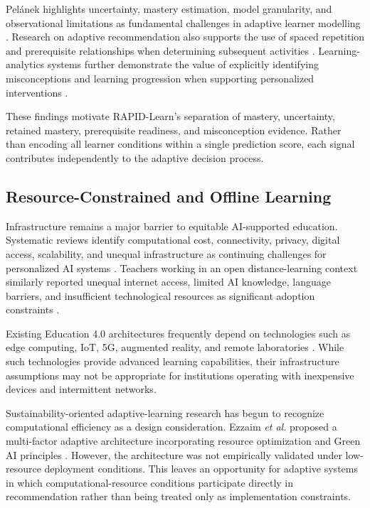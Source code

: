 \documentclass[conference]{IEEEtran}
\begin{document}
Pelánek highlights uncertainty, mastery estimation, model granularity,
and observational limitations as fundamental challenges in adaptive
learner modelling \cite{pelanek2025hard}. Research on adaptive
recommendation also supports the use of spaced repetition and
prerequisite relationships when determining subsequent activities
\cite{pelanek2024rules}. Learning-analytics systems further demonstrate
the value of explicitly identifying misconceptions and learning
progression when supporting personalized interventions
\cite{sajja2025}.

These findings motivate RAPID-Learn's separation of mastery,
uncertainty, retained mastery, prerequisite readiness, and misconception
evidence. Rather than encoding all learner conditions within a single
prediction score, each signal contributes independently to the adaptive
decision process.

\subsection{Resource-Constrained and Offline Learning}

Infrastructure remains a major barrier to equitable AI-supported
education. Systematic reviews identify computational cost, connectivity,
privacy, digital access, scalability, and unequal infrastructure as
continuing challenges for personalized AI systems
\cite{hariyanto2025,mimoudi2025}. Teachers working in an open
distance-learning context similarly reported unequal internet access,
limited AI knowledge, language barriers, and insufficient technological
resources as significant adoption constraints
\cite{vandenberg2025}.

Existing Education 4.0 architectures frequently depend on technologies
such as edge computing, IoT, 5G, augmented reality, and remote
laboratories \cite{boltsi2024}. While such technologies provide advanced
learning capabilities, their infrastructure assumptions may not be
appropriate for institutions operating with inexpensive devices and
intermittent networks.

Sustainability-oriented adaptive-learning research has begun to
recognize computational efficiency as a design consideration.
Ezzaim \textit{et al.} proposed a multi-factor adaptive architecture
incorporating resource optimization and Green AI principles
\cite{ezzaim2024}. However, the architecture was not empirically
validated under low-resource deployment conditions. This leaves an
opportunity for adaptive systems in which computational-resource
conditions participate directly in recommendation rather than being
treated only as implementation constraints.
\end{document}
